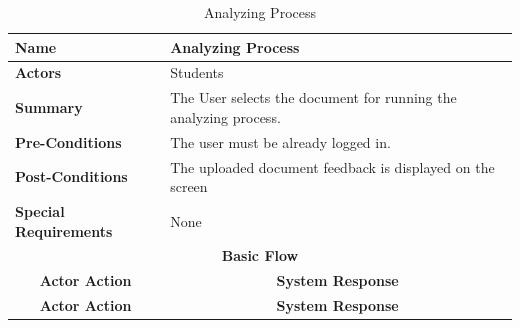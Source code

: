\documentclass{FastFyp}
\begin{document}
\begin{longtable}{|lllll|}
\caption{Analyzing Process} \label{tab:delete-fyp-post} \\ \hline
\multicolumn{2}{|l|}{\textbf{Name}} &
  \multicolumn{3}{l|}{Analyzing Process} \\ \hline
\multicolumn{2}{|l|}{\textbf{Actors}} &
  \multicolumn{3}{l|}{Students} \\ \hline
\multicolumn{2}{|l|}{\textbf{Summary}} &
  \multicolumn{3}{l|}{The User selects the document for running the analyzing process.} \\ \hline
\multicolumn{2}{|l|}{\textbf{Pre-Conditions}} &
  \multicolumn{3}{l|}{The user must be already logged in.} \\ \hline
\multicolumn{2}{|l|}{\textbf{Post-Conditions}} &
  \multicolumn{3}{l|}{The uploaded document feedback is displayed on the screen} \\ \hline
\multicolumn{2}{|l|}{\textbf{Special Requirements}} &
  \multicolumn{3}{l|}{None} \\ \hline
\multicolumn{5}{|c|}{\textbf{Basic Flow}} \\ \hline
\multicolumn{3}{|c|}{\textbf{Actor Action}} &
  \multicolumn{2}{c|}{\textbf{System Response}} \\ \hline
\endfirsthead %
\hline
\multicolumn{3}{|c|}{\textbf{Actor Action}} &
  \multicolumn{2}{c|}{\textbf{System Response}} \\ \hline
\endhead %


\end{longtable}
\end{document}

